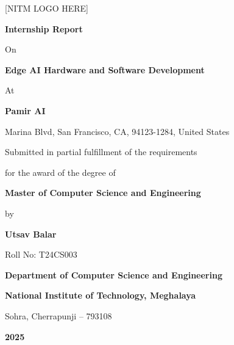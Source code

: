 \documentclass[12pt,a4paper]{report}
\begin{document}

\begin{titlepage}
    \centering

    \vspace*{1cm}

    {\Large [NITM LOGO HERE]}

    \vspace{1.5cm}

    {\LARGE\bfseries Internship Report}

    \vspace{1cm}

    {\Large On}

    \vspace{0.5cm}

    {\LARGE\bfseries Edge AI Hardware and Software Development}

    \vspace{1cm}

    {\Large At}

    \vspace{0.5cm}

    {\LARGE\bfseries Pamir AI}

    \vspace{0.3cm}

    {\large Marina Blvd, San Francisco, CA, 94123-1284, United States}

    \vspace{1.5cm}

    {\large Submitted in partial fulfillment of the requirements}

    {\large for the award of the degree of}

    \vspace{0.5cm}

    {\Large\bfseries Master of Computer Science and Engineering}

    \vspace{1cm}

    {\large by}

    \vspace{0.5cm}

    {\Large\bfseries Utsav Balar}

    {\large Roll No: T24CS003}

    \vfill

    {\large\bfseries Department of Computer Science and Engineering}

    {\large\bfseries National Institute of Technology, Meghalaya}

    {\large Sohra, Cherrapunji -- 793108}

    \vspace{0.5cm}

    {\large\bfseries 2025}

\end{titlepage}
\end{document}
